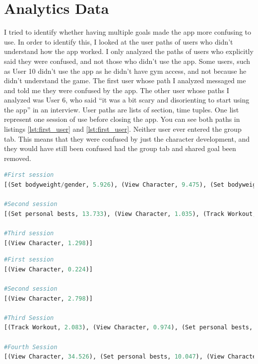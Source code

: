 \documentclass{l4proj}
\begin{document}
\section{Analytics Data}
I tried to identify whether having multiple goals made the app more confusing to use. In order to identify this, I looked at the user paths of users who didn't understand how the app worked. I only analyzed the paths of users who explicitly said they were confused, and not those who didn't use the app. Some users, such as User 10 didn't use the app as he didn't have gym access, and not because he didn't understand the game. The first user whose path I analyzed messaged me and told me they were confused by the app. The other user whose paths I analyzed was User 6, who said ``it was a bit scary and disorienting to start using the app'' in an interview. User paths are lists of section, time tuples. One list represent one session of use before closing the app. You can see both paths in listings \ref{lst:first_user} and \ref{lst:first_user}. Neither user ever entered the group tab. This means that they were confused by just the character development, and they would have still been confused had the group tab and shared goal been removed.

\begin{lstlisting}[language=python, caption={The user paths the user who messaged me}, label=lst:first_user]
#First session
[(Set bodyweight/gender, 5.926), (View Character, 9.475), (Set bodyweight/gender, 1.286), (View Character, 5.266)]

#Second session
[(Set personal bests, 13.733), (View Character, 1.035), (Track Workout, 2.547), (View Character, 1.998)]                     

#Third session
[(View Character, 1.298)]                                                                                                    
\end{lstlisting}


\begin{lstlisting}[language=python, caption={The user paths User 6 (who was interviewed)}, label=lst:second_user]
#First session
[(View Character, 0.224)]                                                               

#Second session
[(View Character, 2.798)]                                                               

#Third Session
[(Track Workout, 2.083), (View Character, 0.974), (Set personal bests, 39.808)] 

#Fourth Session
[(View Character, 34.526), (Set personal bests, 10.047), (View Character, 3.035)]
\end{lstlisting}
\end{document}
